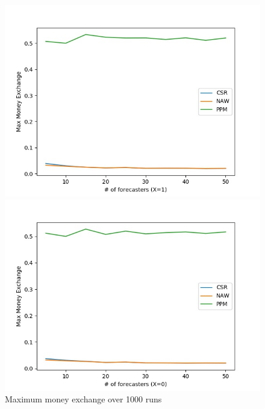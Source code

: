 \documentclass[english,10pt]{article}
\begin{document}
\begin{enumerate}
        	\begin{figure}[H]
        	\centering
        	\begin{minipage}{0.48\textwidth}
        	\includegraphics[width = \textwidth]{(Beta_100_100)Max_MnEx(X=1).jpg}
        	\end{minipage}
        	\begin{minipage}{0.48\textwidth}
        	\includegraphics[width = \textwidth]{(Beta_100_100)Max_MnEx(X=0).jpg}
        	\end{minipage}
        	\caption{Maximum money exchange over 1000 runs}
        	\end{figure}
        	

\end{enumerate}
\end{document}
